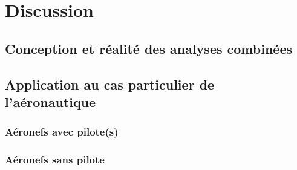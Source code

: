 \chapter{Discussion}
\label{chap:conclusion_discussion}
\minitoc

\section{Conception et réalité des analyses combinées}

\section{Application au cas particulier de l'aéronautique}
\subsection{Aéronefs avec pilote(s)}
\subsection{Aéronefs sans pilote}


